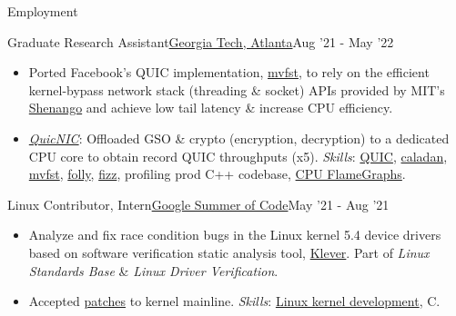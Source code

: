 \documentclass[]{mcdowellcv}
\begin{document}
\begin{cvsection}{Employment}
        \begin{cvsubsection}{Graduate Research Assistant}{\href{https://scs.gatech.edu/}{Georgia Tech, Atlanta}}{Aug '21 - May '22}
            \begin{itemize}
                \item Ported Facebook's QUIC implementation, \href{https://github.com/facebookincubator/mvfst}{mvfst}, to rely on the efficient kernel-bypass network stack (threading \& socket) APIs provided by MIT's \href{https://www.usenix.org/conference/nsdi19/presentation/ousterhout}{Shenango} and achieve low tail latency \& increase CPU efficiency.
                \item \href{https://github.com/saubhik/caladan/pulls}{\textit{QuicNIC}}: Offloaded GSO \& crypto (encryption, decryption) to a dedicated CPU core to obtain record QUIC throughputs (x5). \textit{Skills}:
                \href{https://quicwg.org/}{QUIC},
                \href{https://github.com/shenango/caladan}{caladan}, \href{https://github.com/facebookincubator/mvfst}{mvfst}, \href{https://github.com/facebook/folly}{folly}, \href{https://github.com/facebookincubator/fizz}{fizz}, profiling prod C++ codebase, \href{https://www.brendangregg.com/FlameGraphs/cpuflamegraphs.html}{CPU FlameGraphs}.
            \end{itemize}
        \end{cvsubsection}

        \begin{cvsubsection}{Linux Contributor, Intern}{\href{https://summerofcode.withgoogle.com/archive/2021/projects/4818588170452992}{Google Summer of Code}}{May '21 - Aug '21}
            \begin{itemize}
                \item Analyze and fix race condition bugs in the Linux kernel 5.4 device drivers based on software verification static analysis tool, \href{https://forge.ispras.ru/projects/klever}{Klever}. Part of \textit{Linux Standards Base} \& \textit{Linux Driver Verification}.
                \item Accepted \href{https://lore.kernel.org/lkml/?q=saubhik}{patches} to kernel mainline. \textit{Skills}: \href{https://www.kernel.org/}{Linux kernel development}, C.
            \end{itemize}
        \end{cvsubsection}


\end{cvsection}
\end{document}
